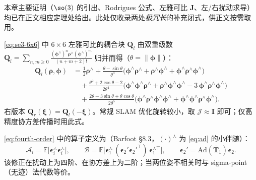 本章主要证明（$\so(3)$ 的引出、Rodrigues 公式、左雅可比 $\mathbf{J}$、左/右扰动求导）均已在正文相应定理处给出。此处仅收录两处\emph{极冗长}的补充闭式，供正文按需取用。

\begin{derivation}
\cref{eq:se3-6x6} 中 $6\times6$ 左雅可比的耦合块 $\mathbf{Q}_l$ 由双重级数 $\mathbf{Q}_l=\sum_{n,m\ge0}\frac{(\boldsymbol{\phi}^\wedge)^n\boldsymbol{\rho}^\wedge(\boldsymbol{\phi}^\wedge)^m}{(n+m+2)!}$ 归并而得（$\theta=\|\boldsymbol{\phi}\|$）：
\begin{align*}
  \mathbf{Q}_l(\boldsymbol{\rho},\boldsymbol{\phi})
  &=\tfrac12\boldsymbol{\rho}^\wedge
   +\frac{\theta-\sin\theta}{\theta^3}\big(\boldsymbol{\phi}^\wedge\boldsymbol{\rho}^\wedge+\boldsymbol{\rho}^\wedge\boldsymbol{\phi}^\wedge+\boldsymbol{\phi}^\wedge\boldsymbol{\rho}^\wedge\boldsymbol{\phi}^\wedge\big)\\
  &\quad+\frac{\theta^2+2\cos\theta-2}{2\theta^4}\big(\boldsymbol{\phi}^\wedge\boldsymbol{\phi}^\wedge\boldsymbol{\rho}^\wedge+\boldsymbol{\rho}^\wedge\boldsymbol{\phi}^\wedge\boldsymbol{\phi}^\wedge-3\,\boldsymbol{\phi}^\wedge\boldsymbol{\rho}^\wedge\boldsymbol{\phi}^\wedge\big)\\
  &\quad+\frac{2\theta-3\sin\theta+\theta\cos\theta}{2\theta^5}\big(\boldsymbol{\phi}^\wedge\boldsymbol{\rho}^\wedge\boldsymbol{\phi}^\wedge\boldsymbol{\phi}^\wedge+\boldsymbol{\phi}^\wedge\boldsymbol{\phi}^\wedge\boldsymbol{\rho}^\wedge\boldsymbol{\phi}^\wedge\big).
\end{align*}
右版本 $\mathbf{Q}_r(\boldsymbol{\xi})=\mathbf{Q}_l(-\boldsymbol{\xi})$。常规 SLAM 优化旋转较小，取 $\boldsymbol{\mathcal{J}}\approx\mathbf{I}$ 即可；仅高精度协方差传播时用此式。
\end{derivation}

\begin{derivation}
\cref{eq:fourth-order} 中的算子定义为（Barfoot\cite{barfoot2024state} §8.3，$(\cdot)^\curlywedge$ 为 \cref{eq:ad} 的小伴随）：
\[
  \boldsymbol{\mathcal{A}}_i=\mathbb{E}\!\big[\boldsymbol{\epsilon}_i^\curlywedge\boldsymbol{\epsilon}_i^\curlywedge\big],\qquad
  \boldsymbol{\mathcal{B}}=\mathbb{E}\!\big[\boldsymbol{\epsilon}_1^\curlywedge\,(\boldsymbol{\epsilon}_2'\boldsymbol{\epsilon}_2'^\top)\,\boldsymbol{\epsilon}_1^{\curlywedge\top}\big],\qquad
  \boldsymbol{\epsilon}_2'=\mathrm{Ad}(\bar{\mathbf{T}}_1)\boldsymbol{\epsilon}_2.
\]
该修正在扰动上为四阶、在协方差上为二阶；当两位姿不相关时与 sigma-point（无迹）法代数等价。
\end{derivation}

